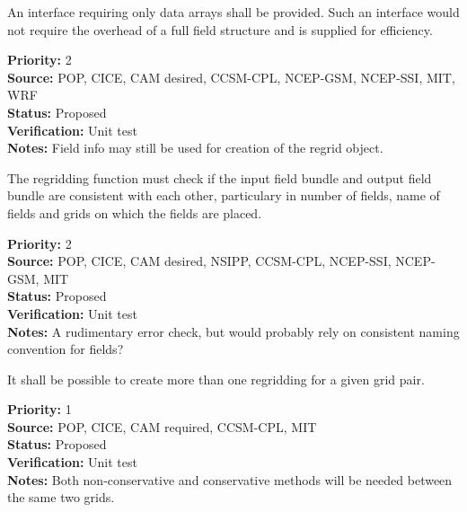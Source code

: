 An interface requiring only data arrays shall be
provided.  Such an interface would not require the overhead
of a full field structure and is supplied for efficiency.

\begin{reqlist}
{\bf Priority:} 2 \\
{\bf Source:} POP, CICE, CAM desired, CCSM-CPL, NCEP-GSM, NCEP-SSI, MIT, WRF \\
{\bf Status:} Proposed \\
{\bf Verification:} Unit test \\
{\bf Notes:} Field info may still be used for creation of the
             regrid object.
\end{reqlist}


The regridding function must check if the input field bundle and output field
bundle are consistent with each other, particulary in number of fields, name of
fields and grids on which the fields are placed.

\begin{reqlist}
{\bf Priority:} 2 \\
{\bf Source:} POP, CICE, CAM desired, NSIPP, CCSM-CPL, NCEP-SSI, NCEP-GSM, MIT \\
{\bf Status:} Proposed \\
{\bf Verification:} Unit test \\
{\bf Notes:} A rudimentary error check, but would probably rely on
             consistent naming convention for fields?
\end{reqlist}


It shall be possible to create more than one regridding for a given grid
pair.

\begin{reqlist}
{\bf Priority:} 1 \\
{\bf Source:} POP, CICE, CAM required, CCSM-CPL, MIT \\
{\bf Status:} Proposed \\
{\bf Verification:} Unit test \\
{\bf Notes:} Both non-conservative and conservative methods will be needed
             between the same two grids.
\end{reqlist}


